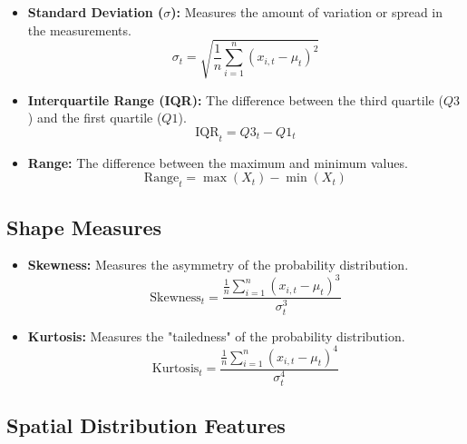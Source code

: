 \begin{itemize}
    \item \textbf{Standard Deviation ($\sigma$):} Measures the amount of variation or spread in the measurements.
    \begin{equation}
        \sigma_t = \sqrt{\frac{1}{n}\sum_{i=1}^{n}(x_{i,t}-\mu_t)^2}
    \end{equation}
    
    \item \textbf{Interquartile Range (IQR):} The difference between the third quartile ($Q3$) and the first quartile ($Q1$).
    \begin{equation}
        \text{IQR}_t = Q3_t - Q1_t
    \end{equation}
    
    \item \textbf{Range:} The difference between the maximum and minimum values.
    \begin{equation}
        \text{Range}_t = \max(X_t) - \min(X_t)
    \end{equation}
\end{itemize}

\subsection{Shape Measures}

\begin{itemize}
    \item \textbf{Skewness:} Measures the asymmetry of the probability distribution.
    \begin{equation}
        \text{Skewness}_t = \frac{\frac{1}{n}\sum_{i=1}^{n}(x_{i,t}-\mu_t)^3}{\sigma_t^3}
    \end{equation}
    
    \item \textbf{Kurtosis:} Measures the "tailedness" of the probability distribution.
    \begin{equation}
        \text{Kurtosis}_t = \frac{\frac{1}{n}\sum_{i=1}^{n}(x_{i,t}-\mu_t)^4}{\sigma_t^4}
    \end{equation}
\end{itemize}

\subsection{Spatial Distribution Features}

